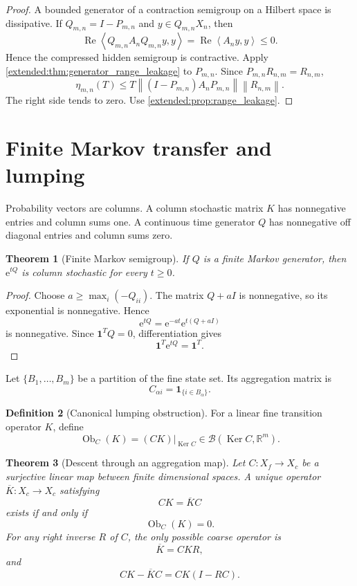 \documentclass[11pt,a4paper]{article}
\newtheorem{theorem}{Theorem}[section]
\theoremstyle{definition}
\newtheorem{definition}[theorem]{Definition}
\theoremstyle{remark}
\newcommand{\Ker}{\operatorname{Ker}}
\newcommand{\norm}[1]{\left\lVert#1\right\rVert}
\newcommand{\RR}{\mathbb R}
\newcommand{\Ob}{\operatorname{Ob}}
\newcommand{\e}{\mathrm e}
\newcommand{\one}{\bm 1}
\newcommand{\ip}[2]{\left\langle#1,#2\right\rangle}
\begin{document}
\begin{proof}
A bounded generator of a contraction semigroup on a Hilbert space is dissipative. If \(Q_{m,n}=I-P_{m,n}\) and \(y\in Q_{m,n}X_n\), then
\[
\operatorname{Re}\ip{Q_{m,n}A_nQ_{m,n}y}{y}
=
\operatorname{Re}\ip{A_ny}{y}
\leq0.
\]
Hence the compressed hidden semigroup is contractive. Apply \cref{extended:thm:generator_range_leakage} to \(P_{m,n}\). Since \(P_{m,n}R_{n,m}=R_{n,m}\),
\[
\eta_{m,n}(T)
\leq
T\norm{(I-P_{m,n})A_nP_{m,n}}
\norm{R_{n,m}}.
\]
The right side tends to zero. Use \cref{extended:prop:range_leakage}.
\end{proof}

\section{Finite Markov transfer and lumping}\label{extended:section:05}\label{extended:sec:markov}

Probability vectors are columns. A column stochastic matrix \(K\) has nonnegative entries and column sums one. A continuous time generator \(Q\) has nonnegative off diagonal entries and column sums zero.

\begin{theorem}[Finite Markov semigroup]\label{extended:record:028}\label{extended:thm:finite_markov}
If \(Q\) is a finite Markov generator, then \(\e^{tQ}\) is column stochastic for every \(t\geq0\).
\end{theorem}

\begin{proof}
Choose \(a\geq\max_i(-Q_{ii})\). The matrix \(Q+aI\) is nonnegative, so its exponential is nonnegative. Hence
\[
\e^{tQ}=\e^{-at}\e^{t(Q+aI)}
\]
is nonnegative. Since \(\one^TQ=0\), differentiation gives
\[
\one^T\e^{tQ}=\one^T.
\]
\end{proof}

Let \(\{B_1,\ldots,B_m\}\) be a partition of the fine state set. Its aggregation matrix is
\[
C_{\alpha i}=\one_{\{i\in B_\alpha\}}.
\]

\begin{definition}[Canonical lumping obstruction]\label{extended:record:029}
For a linear fine transition operator \(K\), define
\[
\Ob_C(K)
=
(CK)|_{\Ker C}
\in
\mathcal B(\Ker C,\RR^m).
\]
\end{definition}

\begin{theorem}[Descent through an aggregation map]\label{extended:record:030}\label{extended:thm:canonical_lumping_obstruction}
Let \(C:X_f\to X_c\) be a surjective linear map between finite dimensional spaces. A unique operator \(\overline K:X_c\to X_c\) satisfying
\[
CK=\overline KC
\]
exists if and only if
\[
\Ob_C(K)=0.
\]
For any right inverse \(R\) of \(C\), the only possible coarse operator is
\[
\overline K=CKR,
\]
and
\[
CK-\overline KC
=
CK(I-RC).
\]
\end{theorem}
\end{document}
